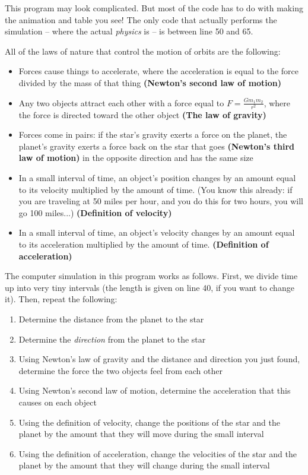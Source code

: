 \documentclass[11pt]{article}
\begin{document}
This program may look complicated. But most of the code has to do with making the animation and table you see! The only code that actually performs the simulation -- where the actual {\it physics} is -- is between line 50 and 65.

All of the laws of nature that control the motion of orbits are the following:

\begin{itemize}
	\item Forces cause things to accelerate, where the acceleration is equal to the force divided by the mass of that thing {\bf (Newton's second law of motion)}
	\item Any two objects attract each other with a force equal to $F=\frac{Gm_1m_2}{r^2}$, where the force is directed toward the other object {\bf (The law of gravity)}
	\item Forces come in pairs: if the star's gravity exerts a force on the planet, the planet's gravity exerts a force back on the star that goes {\bf (Newton's third law of motion)} in the opposite direction and has the same size
	\item In a small interval of time, an object's position changes by an amount equal to its velocity multiplied by the amount of time. (You know this already: if you are traveling at 50 miles per hour, and you do this for two hours, you will go 100 miles...) {\bf (Definition of velocity)}
	\item In a small interval of time, an object's velocity changes by an amount equal to its acceleration multiplied by the amount of time. {\bf (Definition of acceleration)}
\end{itemize}
\newpage

The computer simulation in this program works as follows. First, we divide time up into very tiny intervals (the length is given on line 40, if you want to change it). Then, repeat the following:

\begin{enumerate}
	\item Determine the distance from the planet to the star
	\item Determine the {\it direction} from the planet to the star
	\item Using Newton's law of gravity and the distance and direction you just found, determine the force the two objects feel from each other
	\item Using Newton's second law of motion, determine the acceleration that this causes on each object
	\item Using the definition of velocity, change the positions of the star and the planet by the amount that they will move during the small interval
	\item Using the definition of acceleration, change the velocities of the star and the planet by the amount that they will change during the small interval
\end{enumerate}
\end{document}
